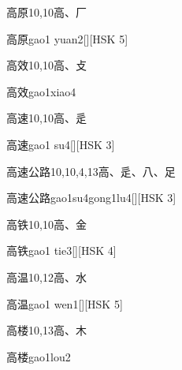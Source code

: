 \begin{entry}{高原}{10,10}{⾼、⼚}
  \begin{phonetics}{高原}{gao1 yuan2}[][HSK 5]
  \end{phonetics}
\end{entry}

\begin{entry}{高效}{10,10}{⾼、⽁}
  \begin{phonetics}{高效}{gao1xiao4}
  \end{phonetics}
\end{entry}

\begin{entry}{高速}{10,10}{⾼、⾡}
  \begin{phonetics}{高速}{gao1 su4}[][HSK 3]
  \end{phonetics}
\end{entry}

\begin{entry}{高速公路}{10,10,4,13}{⾼、⾡、⼋、⾜}
  \begin{phonetics}{高速公路}{gao1su4gong1lu4}[][HSK 3]
  \end{phonetics}
\end{entry}

\begin{entry}{高铁}{10,10}{⾼、⾦}
  \begin{phonetics}{高铁}{gao1 tie3}[][HSK 4]
  \end{phonetics}
\end{entry}

\begin{entry}{高温}{10,12}{⾼、⽔}
  \begin{phonetics}{高温}{gao1 wen1}[][HSK 5]
  \end{phonetics}
\end{entry}

\begin{entry}{高楼}{10,13}{⾼、⽊}
  \begin{phonetics}{高楼}{gao1lou2}
  \end{phonetics}
\end{entry}


